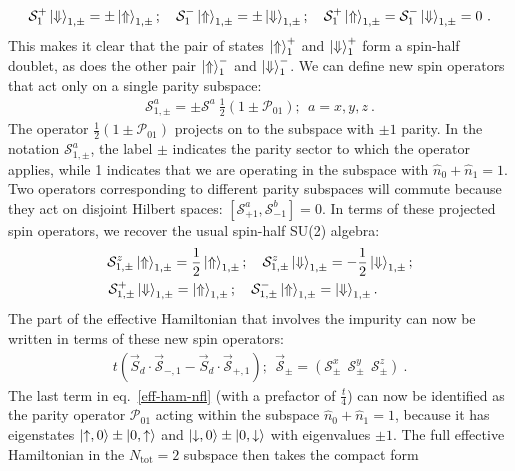 \documentclass{iopart}
\begin{document}
\begin{eqnarray}
	\mathcal{S}_1^+ \ket{\Downarrow}_{1,\pm} = \pm \ket{\Uparrow}_{1,\pm}; \quad\mathcal{S}_1^- \ket{\Uparrow}_{1,\pm} = \pm \ket{\Downarrow}_{1,\pm}; \quad\mathcal{S}_1^+ \ket{\Uparrow}_{1,\pm} = \mathcal{S}_1^- \ket{\Downarrow}_{1,\pm} = 0~.
\end{eqnarray}
This makes it clear that the pair of states \(\ket{\Uparrow}^{+}_1\) and \(\ket{\Downarrow}^{+}_1\) form a spin-half doublet, as does the other pair \(\ket{\Uparrow}^{-}_1\) and \(\ket{\Downarrow}^{-}_1\). We can define new spin operators that act only on a single parity subspace:
\begin{eqnarray}
	\mathcal{S}^a_{1,\pm} = \pm \mathcal{S}^a ~\frac{1}{2}\left(1 \pm \mathcal{P}_{01}\right);~ ~ a=x,y,z~.
\end{eqnarray}
The operator \(\frac{1}{2}\left(1 \pm \mathcal{P}_{01}\right)\) projects on to the subspace with \(\pm 1\) parity. In the notation \(\mathcal{S}^a_{1,\pm}\), the label \(\pm\) indicates the parity sector to which the operator applies, while 1 indicates that we are operating in the subspace with \(\hat n_0 + \hat n_1 = 1\). Two operators corresponding to different parity subspaces will commute because they act on disjoint Hilbert spaces: \(\left[\mathcal{S}^a_{+1}, \mathcal{S}^b_{-1}\right] = 0\). In terms of these projected spin operators, we recover the usual spin-half SU(2) algebra:
\begin{eqnarray}
	\mathcal{S}^z_{1,\pm} \ket{\Uparrow}_{1,\pm} = \frac{1}{2}\ket{\Uparrow}_{1,\pm}; \quad\mathcal{S}^z_{1,\pm}\ket{\Downarrow}_{1,\pm} = -\frac{1}{2}\ket{\Downarrow}_{1,\pm};\nonumber\\
	\mathcal{S}^+_{1,\pm} \ket{\Downarrow}_{1,\pm} = \ket{\Uparrow}_{1,\pm}; \quad\mathcal{S}^-_{1,\pm} \ket{\Uparrow}_{1,\pm} = \ket{\Downarrow}_{1,\pm}.\hspace*{25pt}
\end{eqnarray}
The part of the effective Hamiltonian that involves the impurity can now be written in terms of these new spin operators:
\begin{eqnarray}
	t\left(\vec{S}_d\cdot\vec{\mathcal{S}}_{-,1} - \vec{S}_d\cdot\vec{\mathcal{S}}_{+,1}\right); ~ ~ \vec{\mathcal{S}}_{\pm} = \left(\mathcal{S}_{\pm}^x ~ ~ \mathcal{S}_{\pm}^y ~ ~\mathcal{S}_{\pm}^z\right)~.
\end{eqnarray}
The last term in eq.~\eqref{eff-ham-nfl} (with a prefactor of \(\frac{t}{4}\)) can now be identified as the parity operator \(\mathcal{P}_{01}\) acting within the subspace \(\hat n_0 + \hat n_1 = 1\), because it has eigenstates \(\ket{\uparrow,0}\pm\ket{0,\uparrow}\) and \(\ket{\downarrow,0}\pm\ket{0,\downarrow}\) with eigenvalues \(\pm 1\). The full effective Hamiltonian in the \(N_\text{tot}=2\) subspace then takes the compact form
\end{document}
